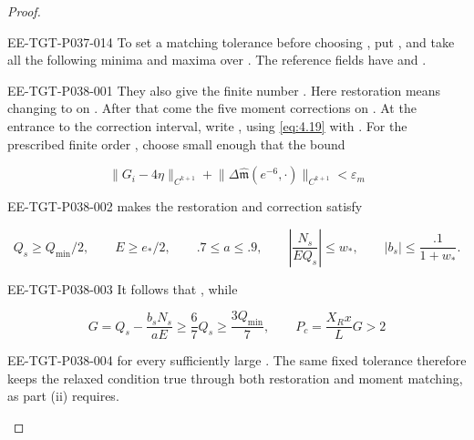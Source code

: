 \begin{proof}
\begin{EESegment}{EE-TGT-P037-014}
To set a matching tolerance before choosing , put
, and take all the following minima and maxima over
. The reference fields have
 and
.
\end{EESegment}
\begin{EESegment}{EE-TGT-P038-001}
They also give the finite number
. Here restoration means changing
 to  on
. After that come the five moment corrections on
. At the entrance
 to the correction interval, write
,
using \eqref{eq:4.19} with . For the prescribed finite order
, choose  small enough that the bound
\end{EESegment}
\[
\lVert G_i-4\eta\rVert_{C^{k+1}}+
\lVert\Delta\widehat{\mathfrak m}(e^{-6},\mathord\cdot)\rVert_{C^{k+1}}<\varepsilon_m
\]
\begin{EESegment}{EE-TGT-P038-002}
makes the restoration and correction satisfy
\end{EESegment}
\[
Q_s\ge Q_{\min}/2,\qquad E\ge e_*/2,\qquad .7\le a\le .9,
\qquad
\left\lvert\frac{N_s}{EQ_s}\right\rvert\le w_*,
\qquad
\lvert b_s\rvert\le\frac{.1}{1+w_*}.
\]
\begin{EESegment}{EE-TGT-P038-003}
It follows that , while
\end{EESegment}
\[
G=Q_s-\frac{b_sN_s}{aE}\ge\frac67Q_s\ge\frac{3Q_{\min}}7,
\qquad
P_c=\frac{X_Rx}{L}G>2
\]
\begin{EESegment}{EE-TGT-P038-004}
for every sufficiently large . The same fixed tolerance therefore keeps the relaxed
condition true through both restoration and moment matching, as part (ii) requires.
\end{EESegment}


\end{proof}
